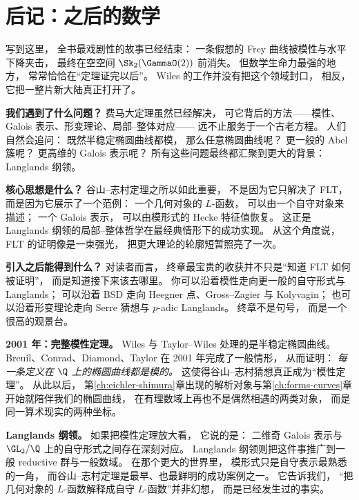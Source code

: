 \section{后记：之后的数学}
\label{sec:ch10-epilogue}

写到这里，
全书最戏剧性的故事已经结束：
一条假想的 Frey 曲线被模性与水平下降夹击，
最终在空空间 $\Sk_2(\GammaO(2))$ 前消失。
但数学生命力最强的地方，
常常恰恰在“定理证完以后”。
Wiles 的工作并没有把这个领域封口，
相反，它把一整片新大陆真正打开了。

\textbf{我们遇到了什么问题？}
费马大定理虽然已经解决，
可它背后的方法——模性、Galois 表示、形变理论、局部--整体对应——
远不止服务于一个古老方程。
人们自然会追问：
既然半稳定椭圆曲线都模，
那么任意椭圆曲线呢？
更一般的 Abel 簇呢？
更高维的 Galois 表示呢？
所有这些问题最终都汇聚到更大的背景：Langlands 纲领。

\textbf{核心思想是什么？}
谷山--志村定理之所以如此重要，
不是因为它只解决了 FLT，
而是因为它展示了一个范例：
一个几何对象的 $L$-函数，
可以由一个自守对象来描述；
一个 Galois 表示，
可以由模形式的 Hecke 特征值恢复。
这正是 Langlands 纲领的局部--整体哲学在最经典情形下的成功实现。
从这个角度说，
FLT 的证明像是一束强光，
把更大理论的轮廓短暂照亮了一次。

\textbf{引入之后能得到什么？}
对读者而言，
终章最宝贵的收获并不只是“知道 FLT 如何被证明”，
而是知道接下来该去哪里。
你可以沿着模性走向更一般的自守形式与 Langlands；
可以沿着 BSD 走向 Heegner 点、Gross--Zagier 与 Kolyvagin；
也可以沿着形变理论走向 Serre 猜想与 $p$-adic Langlands。
终章不是句号，
而是一个很高的观景台。



\textbf{2001 年：完整模性定理。}
Wiles 与 Taylor--Wiles 处理的是半稳定椭圆曲线。
Breuil、Conrad、Diamond、Taylor 在 2001 年完成了一般情形，
从而证明：
\emph{每一条定义在 $\Q$ 上的椭圆曲线都是模的。}
这使得谷山--志村猜想真正成为“模性定理”。
从此以后，
第\ref{ch:eichler-shimura}章出现的解析对象与第\ref{ch:forms-curves}章开始就陪伴我们的椭圆曲线，
在有理数域上再也不是偶然相遇的两类对象，
而是同一算术现实的两种坐标。

\textbf{Langlands 纲领。}
如果把模性定理放大看，
它说的是：
二维奇 Galois 表示与 $\GL_2/\Q$ 上的自守形式之间存在深刻对应。
Langlands 纲领则把这件事推广到一般 reductive 群与一般数域。
在那个更大的世界里，
模形式只是自守表示最熟悉的一角，
而谷山--志村定理是最早、也最鲜明的成功案例之一。
它告诉我们，
“把几何对象的 $L$-函数解释成自守 $L$-函数”并非幻想，
而是已经发生过的事实。

